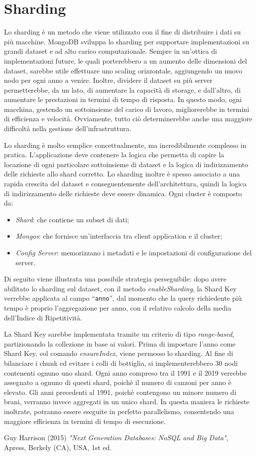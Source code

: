 \documentclass[fleqn,10pt]{SelfArx} %
\begin{document}
\section*{Sharding}

Lo sharding è un metodo che viene utilizzato con il fine di distribuire i dati su più macchine.
MongoDB sviluppa lo sharding per supportare implementazioni su grandi dataset e ad alto carico computazionale.
Sempre in un’ottica di implementazioni future, le quali porterebbero a un aumento delle dimensioni del dataset, sarebbe utile effettuare uno scaling orizzontale, aggiungendo un nuovo nodo per ogni anno a venire. Inoltre, dividere il dataset su più server permetterebbe, da un lato, di aumentare la capacità di storage, e dall’altro, di aumentare le prestazioni in termini di tempo di risposta. In questo modo, ogni macchina, gestendo un sottoinsieme del carico di lavoro, migliorerebbe in termini di efficienza e velocità.
Ovviamente, tutto ciò determinerebbe anche una maggiore difficoltà nella gestione dell’infrastruttura. 

Lo sharding è molto semplice concettualmente, ma incredibilmente complesso in pratica. L'applicazione deve contenere la logica che permetta di capire la locazione di ogni particolare sottoinsieme di dataset e la logica di indirizzamento delle richieste allo shard corretto. Lo sharding inoltre è spesso associato a una rapida crescita del dataset e conseguentemente dell'architettura, quindi la logica di indirizzamento delle richieste deve essere dinamica.
Ogni cluster è composto da:
\begin{itemize}
    \item \textit{Shard}: che contiene un subset di dati;
    \item \textit{Mongos}: che fornisce un’interfaccia tra client application e il cluster;
    \item \textit{Config Server}: memorizzano i metadati e le impostazioni di configurazione del server.
\end{itemize} 
Di seguito viene illustrata una possibile strategia perseguibile: dopo avere abilitato lo sharding sul dataset, con il metodo \textit{enableSharding}, la Shard Key verrebbe applicata al campo “\texttt{anno}”, dal momento che la query richiedente più tempo è proprio l’aggregazione per anno, con il relativo calcolo della media dell'Indice di Ripetitività. 

La Shard Key sarebbe implementata tramite un criterio di tipo \textit{range-based}, partizionando la collezione in base ai valori. Prima di impostare l’anno come Shard Key, col comando \textit{ensureIndex}, viene permesso lo sharding. Al fine di bilanciare i chunk ed evitare i colli di bottiglia, si implementerebbero 30 nodi contenenti ognuno uno shard. Ogni anno compreso tra il 1991 e il 2019 verrebbe assegnato a ognuno di questi shard, poichè il numero di canzoni per anno è elevato. Gli anni precedenti al 1991, poichè contengono un minore numero di brani, verranno invece  aggregati in un unico shard. In questa maniera le richieste inoltrate, potranno essere eseguite in perfetto parallelismo, consentendo una maggiore efficienza in termini di tempo di esecuzione.


\begin{thebibliography}{9}
Guy Harrison (2015) \emph{"Next Generation Databases: NoSQL and Big Data"}, Apress, Berkely (CA), USA, 1st ed.

\end{thebibliography}
\end{document}
